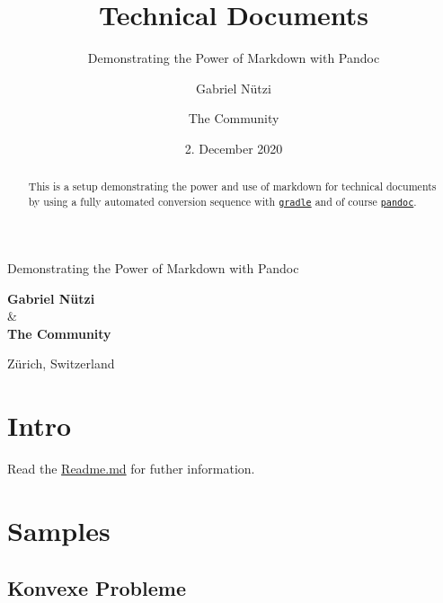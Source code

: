 \documentclass[
  12pt,
  british,
  paper=a4,
  twoside,
  titlepage=true,
  openright,
  abstract=on,
  toc=listofnumbered,
  numbers=noenddot,
  chapterprefix=true,
  headings=optiontohead,
  svgnames,
  dvipsnames]{scrreprt}
\title{Technical Documents}
\subtitle{Demonstrating the Power of Markdown with Pandoc}
\author{Gabriel Nützi \and The Community}
\date{2. December 2020}
\begin{document}
\begin{titlepage}
\makeatletter
\begin{center}

\end{center}
\vspace{1cm}
\begin{center}
\Huge \textbf{\@title}
\end{center}
\begin{center}
\LARGE Demonstrating the Power of Markdown with Pandoc
\end{center}
\vspace{1cm}
\begin{center}
\textbf{Gabriel Nützi} \\ \& \\ \textbf{The Community}
\end{center}
\begin{center}
\@date
\end{center}
\begin{center}
\vfill
Zürich, Switzerland
\vspace{1cm}
\end{center}
\makeatother
\end{titlepage}
\begin{abstract}
This is a setup demonstrating the power and use of markdown for
technical documents by using a fully automated conversion sequence with
\href{https://gradle.org}{\texttt{gradle}} and of course
\href{https://pandoc.org}{\texttt{pandoc}}.
\end{abstract}

{
\hypersetup{linkcolor=Black}
\setcounter{tocdepth}{2}
\tableofcontents
}
\hypertarget{intro}{%
\chapter{Intro}\label{intro}}

Read the
\href{https://github.com/gabyx/TechnicalMarkdown/blob/master/Readme.md}{Readme.md}
for futher information.

\hypertarget{samples}{%
\chapter{Samples}\label{samples}}

\hypertarget{konvexe-probleme}{%
\section{Konvexe Probleme}\label{konvexe-probleme}}
\end{document}
